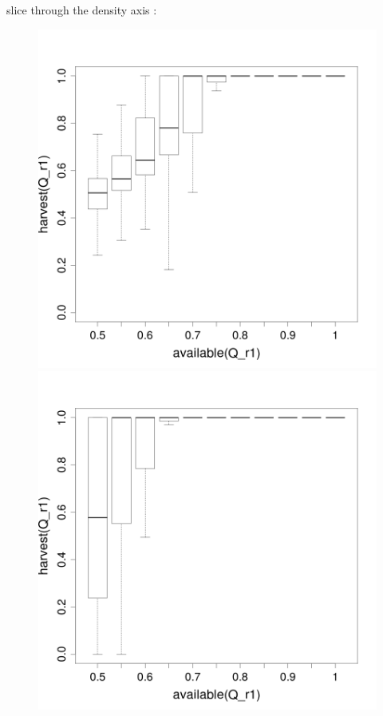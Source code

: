 \documentclass[8pt, handout=show,notes=show]{beamer}
\begin{document}
\begin{frame}{ slice through the density axis : }\addtocounter{framenumber}{-1}
\begin{figure}[H]
\includegraphics[width=\imgSize]{images/harvestr1_r1_density-2.png}
\includegraphics[width=\imgSize]{images/harvestr1_r1_density-8.png}\\

\end{figure}
\end{frame}
\end{document}
